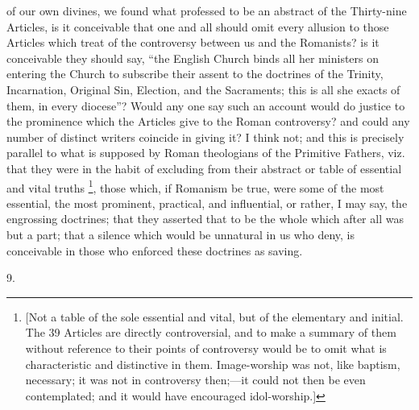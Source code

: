 of our own divines, we found what professed to be an abstract of the
Thirty-nine Articles, is it conceivable that one and all should omit
every allusion to those Articles which treat of the controversy
between us and the Romanists? is it conceivable they should say,
``the English Church binds all her ministers on entering the
Church to subscribe their assent to the doctrines of the Trinity,
Incarnation, Original Sin, Election, and the Sacraments; this is all
she exacts of them, in every diocese''? Would any one say such an
account would do justice to the prominence which the Articles give to
the Roman controversy? and could any number of distinct writers
coincide in giving it? I think not; and this is precisely parallel to
what is supposed by Roman theologians of the Primitive Fathers, viz.
that they were in the habit of excluding from their abstract or table
of essential and vital truths \footnote{[Not a table of the sole essential and
vital, but of the elementary and initial. The 39 Articles are directly
controversial, and to make a summary of them without reference to
their points of controversy would be to omit what is characteristic
and distinctive in them. Image-worship was not, like baptism,
necessary; it was not in controversy then;—it could not then be even
contemplated; and it would have encouraged idol-worship.]},
those which, if Romanism be true, were some of the most essential, the
most prominent, practical, and influential, or rather, I may say, the
engrossing doctrines; that they asserted that to be the whole which
after all was but a part; that a silence which would be unnatural in
us who deny, is conceivable in those who enforced these doctrines as
saving.

9.

